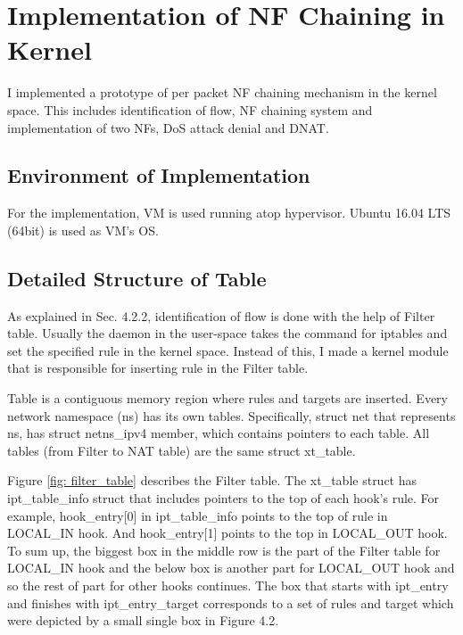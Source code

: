 \section{Implementation of NF Chaining in Kernel}
I implemented a prototype of per packet NF chaining mechanism in the kernel space. This includes identification of flow, NF chaining system and implementation of two NFs, DoS attack denial and DNAT. 

\subsection{Environment of Implementation}
For the implementation, VM is used running atop hypervisor. Ubuntu 16.04 LTS (64bit) is used as VM's OS. 

\subsection{Detailed Structure of Table}
As explained in Sec. 4.2.2, identification of flow is done with the help of Filter table. Usually the daemon in the user-space takes the command for iptables and set the specified rule in the kernel space. Instead of this, I made a kernel module that is responsible for inserting rule in the Filter table. 

Table is a contiguous memory region where rules and targets are inserted. Every network namespace (ns) has its own tables. Specifically, struct net that represents ns, has struct netns\_ipv4 member, which contains pointers to each table. All tables (from Filter to NAT table) are the same struct xt\_table. 

Figure \ref{fig: filter_table} describes the Filter table. The xt\_table struct has ipt\_table\_info struct that includes pointers to the top of each hook's rule. For example, hook\_entry[0] in ipt\_table\_info points to the top of rule in LOCAL\_IN hook. And hook\_entry[1] points to the top in LOCAL\_OUT hook. To sum up, the biggest box in the middle row is the part of the Filter table for LOCAL\_IN hook and the below box is another part for LOCAL\_OUT hook and so the rest of part for other hooks continues. The box that starts with ipt\_entry and finishes with ipt\_entry\_target corresponds to a set of rules and target which were depicted by a small single box in Figure 4.2. 


